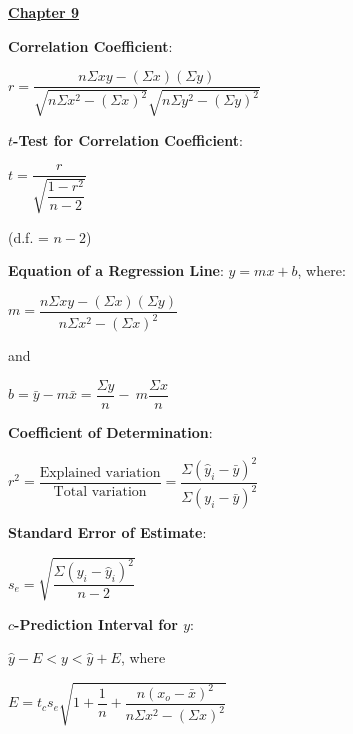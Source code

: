 \documentclass{article}
\begin{document}
\begin{large}
\vspace{0.25in}

\underline{\textbf{\huge Chapter 9 \phantom{ } \phantom{ } \phantom{ } \phantom{ }}}

\textbf{Correlation Coefficient}:

\hspace{1.0in} \begin{Large}$r = \dfrac{n\Sigma xy - (\Sigma x)(\Sigma y)}{\sqrt{n\Sigma x^{2} - (\Sigma x)^2}\sqrt{n\Sigma y^{2} - (\Sigma y)^{2}}}$\end{Large}

\textbf{$t$-Test for Correlation Coefficient}:

\hspace{1.0in} \begin{Large}$t = \dfrac{r}{\sqrt{\dfrac{1 - r^{2}}{n - 2}}}$\end{Large} (d.f. = $n-2$)

\textbf{Equation of a Regression Line}: $\hat{y} = mx + b$, where:

\hspace{1.0in} \begin{Large}$m = \dfrac{n\Sigma xy - (\Sigma x)(\Sigma y)}{n\Sigma x^{2} - (\Sigma x)^2}$\end{Large} and

\hspace{1.0in} \begin{Large}$b = \bar{y} - m\bar{x} = \dfrac{\Sigma y}{n} -\ m \dfrac{\Sigma x}{n}$\end{Large}

\textbf{Coefficient of Determination}:

\hspace{1.0in} \begin{Large}$r^{2} = \dfrac{\text{Explained variation}}{\text{Total variation}} = \dfrac{\Sigma (\hat{y}_{i} - \bar{y})^{2}}{\Sigma (y_{i} - \bar{y})^{2}}$\end{Large}

\textbf{Standard Error of Estimate}: 

\hspace{1.0in} \begin{Large}$s_{e} = \sqrt{\dfrac{\Sigma (y_{i} - \hat{y}_{i})^{2}}{n-2}}$\end{Large}

\textbf{$c$-Prediction Interval for $y$}: 

\hspace{0.1in} $\hat{y} - E < y < \hat{y} + E$, where \begin{Large}$E = t_{c}s_{e}\sqrt{1 + \dfrac{1}{n} + \dfrac{n(x_{o} - \bar{x})^{2}}{n\Sigma x^{2} - (\Sigma x)^{2}}}$\end{Large}


\end{large}
\end{document}
